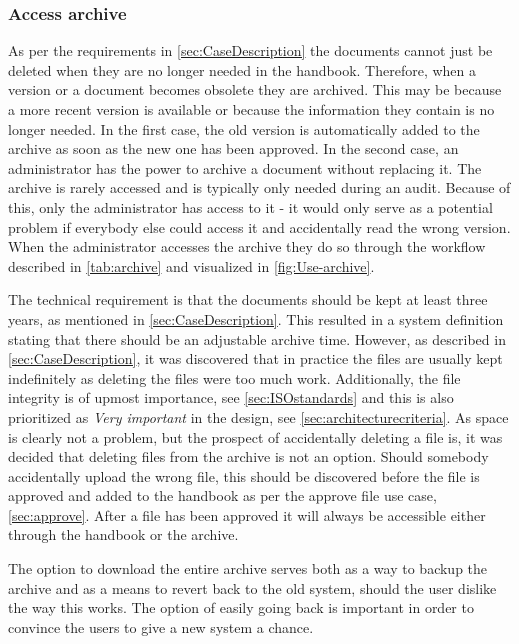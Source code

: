 \subsubsection{Access archive}
As per the requirements in \cref{sec:CaseDescription} the documents cannot just be deleted when they are no longer needed in the handbook.
Therefore, when a version or a document becomes obsolete they are archived.
This may be because a more recent version is available or because the information they contain is no longer needed.
In the first case, the old version is automatically added to the archive as soon as the new one has been approved.
In the second case, an administrator has the power to archive a document without replacing it.
The archive is rarely accessed and is typically only needed during an audit.
Because of this, only the administrator has access to it - it would only serve as a potential problem if everybody else could access it and accidentally read the wrong version.
When the administrator accesses the archive they do so through the workflow described in \cref{tab:archive} and visualized in \cref{fig:Use-archive}.




The technical requirement is that the documents should be kept at least three years, as mentioned in \cref{sec:CaseDescription}.
This resulted in a system definition stating that there should be an adjustable archive time.
However, as described in \cref{sec:CaseDescription}, it was discovered that in practice the files are usually kept indefinitely as deleting the files were too much work.
Additionally, the file integrity is of upmost importance, see \cref{sec:ISOstandards} and this is also prioritized as \textit{Very important} in the design, see \cref{sec:architecturecriteria}.
As space is clearly not a problem, but the prospect of accidentally deleting a file is, it was decided that deleting files from the archive is not an option.
Should somebody accidentally upload the wrong file, this should be discovered before the file is approved and added to the handbook as per the approve file use case, \cref{sec:approve}.
After a file has been approved it will always be accessible either through the handbook or the archive.

The option to download the entire archive serves both as a way to backup the archive and as a means to revert back to the old system, should the user dislike the way this works.
The option of easily going back is important in order to convince the users to give a new system a chance.

